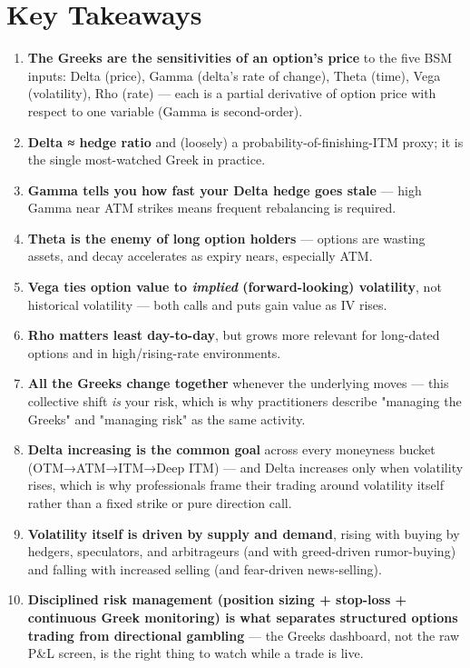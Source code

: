 \documentclass[12pt,openany]{book}
\theoremstyle{definition}
\theoremstyle{remark}
\begin{document}
\section{Key Takeaways}

\begin{enumerate}
\item \textbf{The Greeks are the sensitivities of an option's price} to the five BSM inputs: Delta (price), Gamma (delta's rate of change), Theta (time), Vega (volatility), Rho (rate) — each is a partial derivative of option price with respect to one variable (Gamma is second-order).
\item \textbf{Delta ≈ hedge ratio} and (loosely) a probability-of-finishing-ITM proxy; it is the single most-watched Greek in practice.
\item \textbf{Gamma tells you how fast your Delta hedge goes stale} — high Gamma near ATM strikes means frequent rebalancing is required.
\item \textbf{Theta is the enemy of long option holders} — options are wasting assets, and decay accelerates as expiry nears, especially ATM.
\item \textbf{Vega ties option value to \emph{implied} (forward-looking) volatility}, not historical volatility — both calls and puts gain value as IV rises.
\item \textbf{Rho matters least day-to-day}, but grows more relevant for long-dated options and in high/rising-rate environments.
\item \textbf{All the Greeks change together} whenever the underlying moves — this collective shift \emph{is} your risk, which is why practitioners describe "managing the Greeks" and "managing risk" as the same activity.
\item \textbf{Delta increasing is the common goal} across every moneyness bucket (OTM→ATM→ITM→Deep ITM) — and Delta increases only when volatility rises, which is why professionals frame their trading around volatility itself rather than a fixed strike or pure direction call.
\item \textbf{Volatility itself is driven by supply and demand}, rising with buying by hedgers, speculators, and arbitrageurs (and with greed-driven rumor-buying) and falling with increased selling (and fear-driven news-selling).
\item \textbf{Disciplined risk management (position sizing + stop-loss + continuous Greek monitoring) is what separates structured options trading from directional gambling} — the Greeks dashboard, not the raw P\&L screen, is the right thing to watch while a trade is live.
\end{enumerate}
\end{document}
